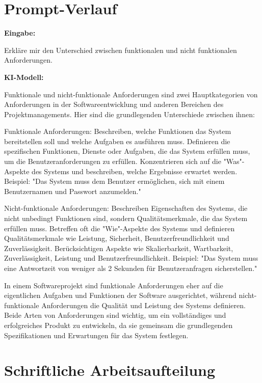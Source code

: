 \section{Prompt-Verlauf}

\textbf{Eingabe:}

Erkläre mir den Unterschied zwischen funktionalen und nicht funktionalen Anforderungen.

\textbf{KI-Modell:}

Funktionale und nicht-funktionale Anforderungen sind zwei Hauptkategorien von Anforderungen in der Softwareentwicklung und anderen Bereichen des Projektmanagements. Hier sind die grundlegenden Unterschiede zwischen ihnen:

Funktionale Anforderungen:
Beschreiben, welche Funktionen das System bereitstellen soll und welche Aufgaben es ausführen muss.
Definieren die spezifischen Funktionen, Dienste oder Aufgaben, die das System erfüllen muss, um die Benutzeranforderungen zu erfüllen.
Konzentrieren sich auf die "Was"-Aspekte des Systems und beschreiben, welche Ergebnisse erwartet werden.
Beispiel: "Das System muss dem Benutzer ermöglichen, sich mit einem Benutzernamen und Passwort anzumelden."

Nicht-funktionale Anforderungen:
Beschreiben Eigenschaften des Systems, die nicht unbedingt Funktionen sind, sondern Qualitätsmerkmale, die das System erfüllen muss.
Betreffen oft die "Wie"-Aspekte des Systems und definieren Qualitätsmerkmale wie Leistung, Sicherheit, Benutzerfreundlichkeit und Zuverlässigkeit.
Berücksichtigen Aspekte wie Skalierbarkeit, Wartbarkeit, Zuverlässigkeit, Leistung und Benutzerfreundlichkeit.
Beispiel: "Das System muss eine Antwortzeit von weniger als 2 Sekunden für Benutzeranfragen sicherstellen."

In einem Softwareprojekt sind funktionale Anforderungen eher auf die eigentlichen Aufgaben und Funktionen der Software ausgerichtet, während nicht-funktionale Anforderungen die Qualität und Leistung des Systems definieren. Beide Arten von Anforderungen sind wichtig, um ein vollständiges und erfolgreiches Produkt zu entwickeln, da sie gemeinsam die grundlegenden Spezifikationen und Erwartungen für das System festlegen.


\section{Schriftliche Arbeitsaufteilung}

